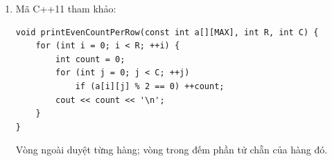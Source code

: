 \documentclass[11pt,a4paper]{article}
\begin{document}
\begin{enumerate}
\begin{minipage}[t]{\linewidth}
\begin{minipage}[t]{\linewidth}
\begin{lstlisting}
void rotate(int a[], int n, int k) {
    k %= n;
    if (k < 0) k += n;
    if (k == 0) return;
    reverseRange(a, 0, n - 1);
    reverseRange(a, 0, k - 1);
    reverseRange(a, k, n - 1);
}
\end{lstlisting}
Ví dụ $[1,2,3,4,5]$ quay phải 2 vị trí thành $[4,5,1,2,3]$. Chuẩn hóa $k$ đưa số bước về đoạn $[0,n-1]$.
\end{minipage}
\end{minipage}
\item \begin{minipage}[t]{\linewidth}
\begin{minipage}[t]{\linewidth}
Mã C++11 tham khảo:
\begin{lstlisting}
void printEvenCountPerRow(const int a[][MAX], int R, int C) {
    for (int i = 0; i < R; ++i) {
        int count = 0;
        for (int j = 0; j < C; ++j)
            if (a[i][j] % 2 == 0) ++count;
        cout << count << '\n';
    }
}
\end{lstlisting}
Vòng ngoài duyệt từng hàng; vòng trong đếm phần tử chẵn của hàng đó.
\end{minipage}
\end{minipage}
\end{enumerate}
\end{document}
